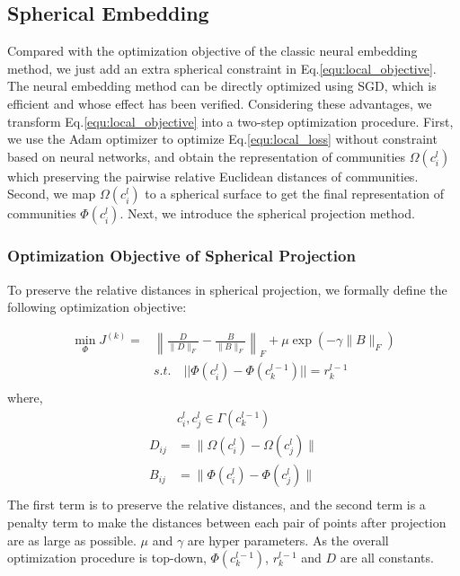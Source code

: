 \documentclass{article}
\theoremstyle{definition}
\begin{document}
	 \subsection{Spherical Embedding}
	 Compared with the optimization objective of the classic neural embedding method, we just add an extra spherical constraint in Eq.\ref{equ:local_objective}. The neural embedding method can be directly optimized using SGD, which is efficient and whose effect has been verified. Considering these advantages, we transform Eq.\ref{equ:local_objective} into a two-step optimization procedure. First, we use the Adam optimizer\cite{Rushing2005ADaM} to optimize Eq.\ref{equ:local_loss} without constraint based on neural networks, and obtain the representation of communities $\Omega(c^l_i)$ which preserving the pairwise relative Euclidean distances of communities. Second, we map $\Omega(c^l_i)$ to a spherical surface to get the final representation of communities $\Phi(c_i^l)$. Next, we introduce the spherical projection method.
	 
	 \subsubsection{Optimization Objective of Spherical Projection}
	 To preserve the relative distances in spherical projection, we formally define the following optimization objective: 

    \begin{equation}
    \label{equ:sphere_objective}
    \begin{split}
    \min_{\Phi} J^{(k)} =  & \left\lVert\frac{D}{\lVert D \rVert_F} - \frac{B}{\lVert B \rVert_F}\right\rVert_F + \mu \exp(- \gamma \lVert B \rVert_F)\\ 
    & s.t. \quad || \Phi(c_i^{l})  - \Phi(c_k^{l-1})||= r_k^{l-1}\\
    \end{split}
    \end{equation}
	 where,
	 \[
	 \begin{split}
	 	& c_i^l,c_j^l \in \Gamma(c_k^{l-1}) \\
	 	D_{ij} & = \lVert \Omega(c^{l}_i) - \Omega(c^{l}_j)\rVert \\
	 	B_{ij} & = \lVert \Phi(c^{l}_i) - \Phi(c^{l}_j)\rVert \\
	 \end{split}
	 \]
	 The first term is to preserve the relative distances, and the second term is a penalty term to make the distances between each pair of points after projection are as large as possible. $\mu$ and $\gamma$ are hyper parameters. As the overall optimization procedure is top-down, $\Phi(c_k^{l-1})$, $r_k^{l-1}$ and $D$ are all constants. 
   
\end{document}
